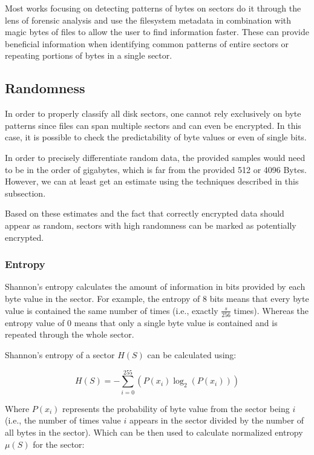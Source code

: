 \documentclass[
  digital, %
  color,   %
  oneside, %
  lof,     %
  nolot,     %
]{fithesis4}
\begin{document}
Most works focusing on detecting patterns of bytes on sectors\cite{foster12, garfmccar15} do it through the lens of forensic analysis and use the filesystem metadata in combination with magic bytes of files to allow the user to find information faster.
These can provide beneficial information when identifying common patterns of entire sectors or repeating portions of bytes in a single sector.\cite{foster12}

\subsection{Randomness}
\label{ssec:randomness}
In order to properly classify all disk sectors, one cannot rely exclusively on byte patterns since files can span multiple sectors and can even be encrypted.
In this case, it is possible to check the predictability of byte values or even of single bits.

In order to precisely differentiate random data, the provided samples would need to be in the order of gigabytes, which is far from the provided 512 or 4096 Bytes.
However, we can at least get an estimate using the techniques described in this subsection.

Based on these estimates and the fact that correctly encrypted data should appear as random, sectors with high randomness can be marked as potentially encrypted.

\subsubsection{Entropy}
\label{sss:entropy}
Shannon's entropy calculates the amount of information in bits provided by each byte value in the sector.\cite{shannon48}
For example, the entropy of 8 bits means that every byte value is contained the same number of times (i.e., exactly $\frac{s}{256}$ times).
Whereas the entropy value of 0 means that only a single byte value is contained and is repeated through the whole sector. 

Shannon's entropy of a sector $H(S)$ can be calculated using:

\begin{equation}
  H(S) = -\sum_{i=0}^{255}(P(x_i)\log_2(P(x_i)))
  \label{eq:entropy}
\end{equation}

Where $P(x_i)$ represents the probability of byte value from the sector being $i$ (i.e., the number of times value $i$ appears in the sector divided by the number of all bytes in the sector). 
Which can be then used to calculate normalized entropy $\mu(S)$ for the sector:
\end{document}
